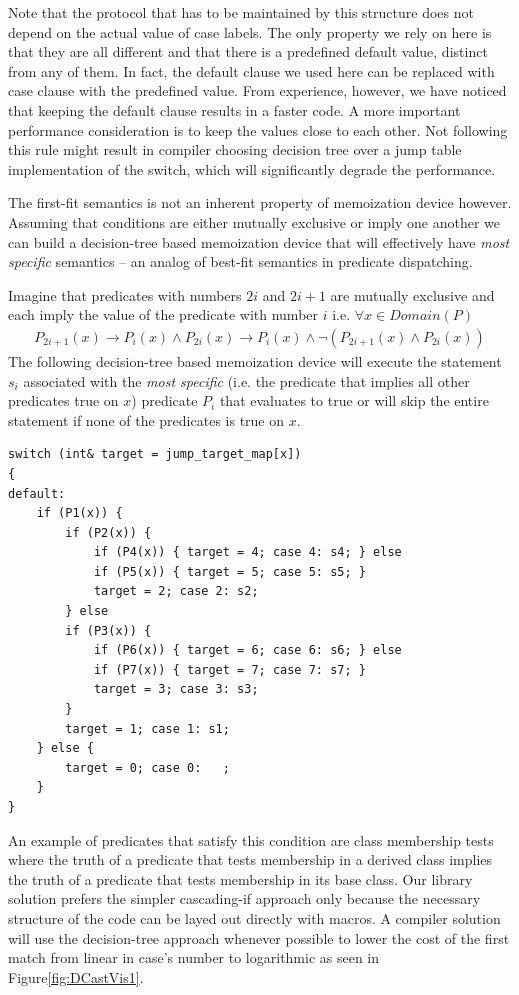 \documentclass[preprint]{sigplanconf}
\begin{document}
Note that the protocol that has to be maintained by this structure does not 
depend on the actual value of case labels. The only property we rely on here is 
that they are all different and that there is a predefined default value, 
distinct from any of them. In fact, the default clause we used here can be 
replaced with case clause with the predefined value. From experience, however, 
we have noticed that keeping the default clause results in a faster code. A more 
important performance consideration is to keep the values close to each other. 
Not following this rule might result in compiler choosing decision tree over a 
jump table implementation of the switch, which will significantly degrade the 
performance.

The first-fit semantics is not an inherent property of memoization device however. 
Assuming that conditions are either mutually exclusive or imply one another we 
can build a decision-tree based memoization device that will effectively have 
\emph{most specific} semantics -- an analog of best-fit semantics in predicate 
dispatching\cite{ErnstKC98}.

Imagine that predicates with numbers $2i$ and $2i+1$ are mutually exclusive and 
each imply the value of the predicate with number $i$ i.e. $\forall x \in Domain(P)$
\begin{eqnarray*}
P_{2i+1}(x)\rightarrow P_i(x) \wedge P_{2i}(x)\rightarrow P_i(x) \wedge \neg(P_{2i+1}(x) \wedge P_{2i}(x))
\end{eqnarray*}
\noindent
The following decision-tree based memoization device will execute the statement 
$s_i$ associated with the \emph{most specific} (i.e. the predicate that implies 
all other predicates true on $x$) predicate $P_i$ that evaluates to true or will 
skip the entire statement if none of the predicates is true on $x$.

\begin{lstlisting}
switch (int& target = jump_target_map[x])
{
default:
    if (P1(x)) {
        if (P2(x)) {
            if (P4(x)) { target = 4; case 4: s4; } else
            if (P5(x)) { target = 5; case 5: s5; } 
            target = 2; case 2: s2;
        } else
        if (P3(x)) {
            if (P6(x)) { target = 6; case 6: s6; } else
            if (P7(x)) { target = 7; case 7: s7; } 
            target = 3; case 3: s3;
        }
        target = 1; case 1: s1;
    } else {
        target = 0; case 0:   ;
    }
}
\end{lstlisting}

An example of predicates that satisfy this condition are class membership tests
where the truth of a predicate that tests membership in a derived class implies 
the truth of a predicate that tests membership in its base class. Our library 
solution prefers the simpler cascading-if approach only because the necessary 
structure of the code can be layed out directly with macros. A compiler solution 
will use the decision-tree approach whenever possible to lower the cost of the 
first match from linear in case's number to logarithmic as seen in Figure\ref{fig:DCastVis1}.
\end{document}
